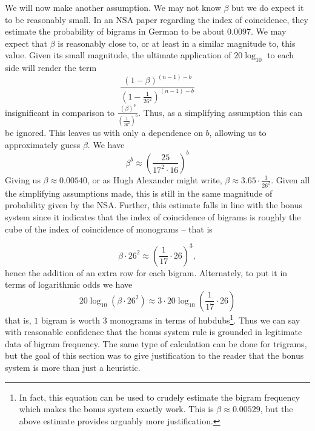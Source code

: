 
  \noindent We will now make another assumption. We may not know
  $\beta$ but we do expect it to be reasonably small. In an NSA paper
  regarding the index of coincidence, they estimate the probability of
  bigrams in German to be about $0.0097$. We may expect that $\beta$ is reasonably close to, or at least in a similar magnitude to, this value.
  Given its small magnitude, the ultimate application of
  $20\log_{10}$ to each side will render the term
  \[
    \frac{(1-\beta)^{(n-1)-b}}{(1-\frac{1}{26^2})^{(n-1)-b}}
  \]
  insignificant in comparison to $\frac{(\beta)^b}{(\frac{1}{26^2})^b}$. Thus, as a simplifying assumption this can be ignored.
  This leaves us with only a dependence on $b$, allowing us to
  approximately guess $\beta$. We have
  \[
    \beta^b \approx
    (\frac{25}{17^2\cdot16})^b
  \]
  Giving us $\beta \approx 0.00540$, or as Hugh Alexander might
  write, $\beta \approx 3.65\cdot\frac{1}{26^2}$. Given all the
  simplifying assumptions made, this is still in the same magnitude
  of probability given by the NSA. Further, this estimate falls in
  line with the bonus system since it indicates that the index of
  coincidence of bigrams is roughly the cube of the index of
  coincidence of monograms -- that is

  \[
    \beta\cdot26^2 \approx (\frac{1}{17}\cdot26)^3,
  \]
  hence the addition of an extra row for each bigram. Alternately, to put it in terms of
  logarithmic odds we have
  \[
    20\log_{10}(\beta\cdot26^2) \approx 3\cdot20\log_{10}(\frac{1}{17}\cdot26)
  \]
  that is, $1$ bigram is worth $3$ monograms in terms of
  hubdubs\footnote{In fact, this equation can be used to crudely
    estimate the bigram frequency which makes the bonus system exactly
    work. This is $\beta\approx0.00529$, but the above estimate
  provides arguably more justification.}. Thus we can say with reasonable
  confidence that the bonus system rule is grounded in legitimate
  data of bigram frequency. The same type of calculation can be done
  for trigrams, but the goal of this section was to give justification
  to the reader that the bonus system is more than just a heuristic.

